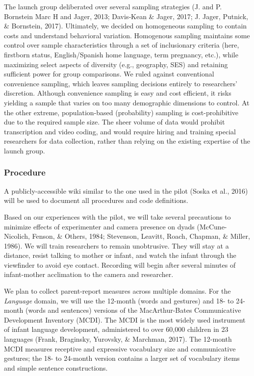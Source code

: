 \documentclass[english,man]{apa6}
\theoremstyle{definition}
\theoremstyle{definition}
\theoremstyle{definition}
\theoremstyle{remark}
\begin{document}
The launch group deliberated over several sampling strategies (J. and P.
Bornstein Marc H and Jager, 2013; Davis‐Kean \& Jager, 2017; J. Jager,
Putnick, \& Bornstein, 2017). Ultimately, we decided on homogeneous
sampling to contain costs and understand behavioral variation.
Homogenous sampling maintains some control over sample characteristics
through a set of inclusionary criteria (here, firstborn status,
English/Spanish home language, term pregnancy, etc.), while maximizing
select aspects of diversity (e.g., geography, SES) and retaining
sufficient power for group comparisons. We ruled against conventional
convenience sampling, which leaves sampling decisions entirely to
researchers' discretion. Although convenience sampling is easy and cost
efficient, it risks yielding a sample that varies on too many
demographic dimensions to control. At the other extreme,
population-based (probability) sampling is cost-prohibitive due to the
required sample size. The sheer volume of data would prohibit
transcription and video coding, and would require hiring and training
special researchers for data collection, rather than relying on the
existing expertise of the launch group.

\subsubsection{Procedure}\label{procedure-1}

A publicly-accessible wiki similar to the one used in the pilot (Soska
et al., 2016) will be used to document all procedures and code
definitions.

Based on our experiences with the pilot, we will take several
precautions to minimize effects of experimenter and camera presence on
dyads (McCune-Nicolich, Fenson, \& Others, 1984; Stevenson, Leavitt,
Roach, Chapman, \& Miller, 1986). We will train researchers to remain
unobtrusive. They will stay at a distance, resist talking to mother or
infant, and watch the infant through the viewfinder to avoid eye
contact. Recording will begin after several minutes of infant-mother
acclimation to the camera and researcher.

We plan to collect parent-report measures across multiple domains. For
the \emph{Language} domain, we will use the 12-month (words and
gestures) and 18- to 24-month (words and sentences) versions of the
MacArthur-Bates Communicative Development Inventory (MCDI). The MCDI is
the most widely used instrument of infant language development,
administered to over 60,000 children in 23 languages (Frank, Braginsky,
Yurovsky, \& Marchman, 2017). The 12-month MCDI measures receptive and
expressive vocabulary size and communicative gestures; the 18- to
24-month version contains a larger set of vocabulary items and simple
sentence constructions.
\end{document}
